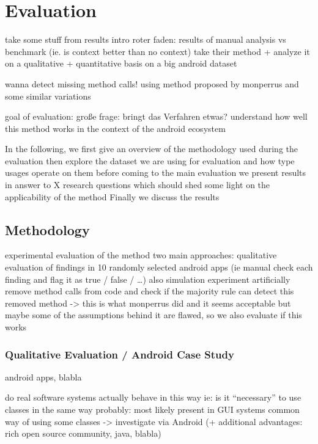 \chapter{Evaluation}\label{ch:eval}

take some stuff from results intro
roter faden: results of manual analysis vs benchmark (ie. is context better than no context)
take their method + analyze it on a qualitative + quantitative basis on a big android dataset

wanna detect missing method calls!
using method proposed by monperrus and some similar variations

goal of evaluation:
große frage: bringt das Verfahren etwas?
understand how well this method works in the context of the android ecosystem

In the following, we first give an overview of the methodology used during the evaluation
then explore the dataset we are using for evaluation and how type usages operate on them
before coming to the main evaluation
we present results in answer to X research questions which should shed some light on the applicability of the method
Finally we discuss the results

\section{Methodology}

experimental evaluation of the  method
two main approaches:
qualitative evaluation of findings in 10 randomly selected android apps
(ie manual check each finding and flag it as true / false / \ldots)
also simulation experiment
artificially remove method calls from code and check if the majority rule can detect this removed method
-> this is what monperrus did and it seems acceptable
but maybe some of the assumptions behind it are flawed, so we also evaluate if this works

\subsection{Qualitative Evaluation / Android Case Study}
android apps, blabla

do real software systems actually behave in this way
ie: is it ``necessary'' to use classes in the same way
probably: most likely present in GUI systems
common way of using some classes -> investigate via Android (+ additional advantages: rich open source community, java, blabla)

